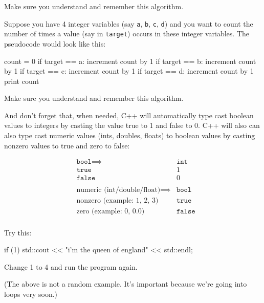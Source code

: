 
Make sure you understand and remember this algorithm.

\newpage{}

Suppose you have 4 integer variables (say \texttt{a}, \texttt{b}, \texttt{c},
\texttt{d}) and you want to count the number of times a value (say in
\texttt{target}) occurs in these integer variables. The pseudocode would
look like this:\\
\begin{console}
count = 0
if target == a:
   increment count by 1
if target == b:
   increment count by 1
if target == c:
   increment count by 1
if target == d:
   increment count by 1
print count 
\end{console}


Make sure you understand and remember this algorithm.

\newpage{}

And don't forget that, when needed, C++ will
automatically type cast boolean values to integers by casting the value
true to 1 and false to 0. C++ will also can also type cast numeric
values (ints, doubles, floats) to boolean values by casting nonzero
values to true and zero to false:

\begin{align*}
&\texttt{bool} \implies &\texttt{int}\\
&\texttt{true} &1\\
&\texttt{false} &0\\\\
&\text{numeric (int/double/float)} \implies &\texttt{bool}\\
&\text{nonzero (example: 1, 2, 3)} &\texttt{true}\\
&\text{zero (example: 0, 0.0)} &\texttt{false}\\
\end{align*}

Try this:\\
\begin{console}
if (1)
std::cout << "i'm the queen of england"
          << std::endl; 
\end{console}

Change 1 to 4 and run the program again.

(The above is not a random example. It's important
because we're going into loops very soon.)

